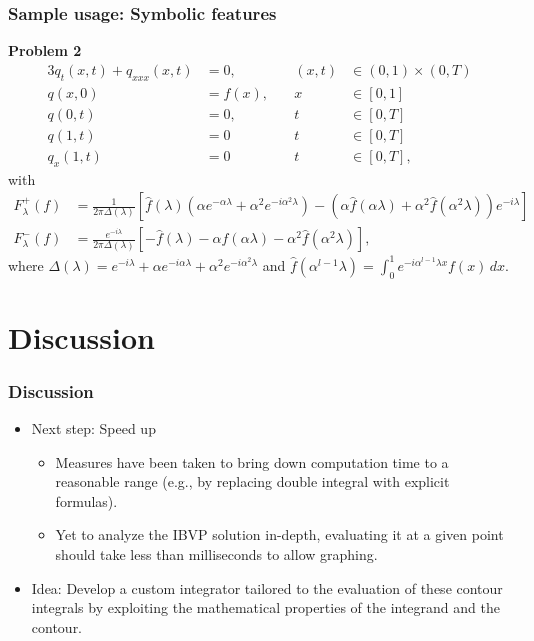 \documentclass{beamer}
\begin{document}
\begin{frame}
    \frametitle{Sample usage: Symbolic features}
    \textbf{Problem 2}
    \small
    \begin{alignat*}{3}
        q_t(x,t) + q_{xxx}(x,t) &= 0,\quad &(x,t)&\in (0,1)\times (0,T)\\
        q(x,0) &= f(x),\quad &x&\in [0,1]\\
        q(0,t) &= 0, \quad &t&\in [0,T]\\
        q(1,t) &= 0\quad &t&\in [0,T]\\
        q_x(1,t) &= 0 \quad &t&\in [0,T],
        \end{alignat*}
        with
        \begin{align*}
        F_\lambda^+(f) &= \frac{1}{2\pi\Delta(\lambda)}\left[\hat{f}(\lambda)(\alpha e^{-\alpha\lambda} + \alpha^2 e^{-i\alpha^2\lambda}) - (\alpha\hat{f}(\alpha\lambda) + \alpha^2\hat{f}(\alpha^2\lambda))e^{-i\lambda}\right]\\
        F_\lambda^-(f) &= \frac{e^{-i\lambda}}{2\pi\Delta(\lambda)}\left[-\hat{f}(\lambda) - \alpha\hat{f}(\alpha\lambda) - \alpha^2\hat{f}(\alpha^2\lambda)\right],
        \end{align*}
        where $\Delta(\lambda) = e^{-i\lambda} + \alpha e^{-i\alpha\lambda} + \alpha^2e^{-i\alpha^2\lambda}$
        and $\hat{f}(\alpha^{l-1}\lambda) = \int_0^1 e^{-i\alpha^{l-1}\lambda x}f(x)\,dx$.
\end{frame}

\section{Discussion}
\begin{frame}
    \frametitle{Discussion}
    \begin{itemize}\setlength\itemsep{1em}
        \item Next step: Speed up
        \begin{itemize}
            \item Measures have been taken to bring down computation time to a reasonable range (e.g., by replacing double integral with explicit formulas).
            \item Yet to analyze the IBVP solution in-depth, evaluating it at a given point should take less than milliseconds to allow graphing.
        \end{itemize}
        \item Idea: Develop a custom integrator tailored to the evaluation of these contour integrals by exploiting the mathematical properties of the integrand and the contour.
    \end{itemize}
\end{frame}
\end{document}
